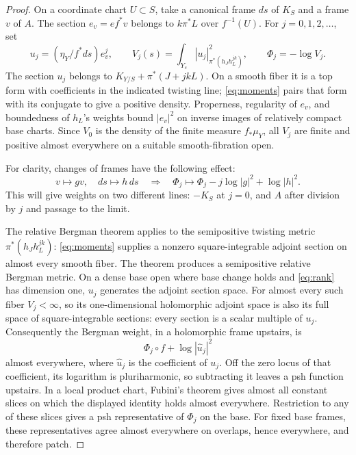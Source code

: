 \begin{proof}
On a coordinate chart \(U\subset S\), take a canonical frame \(ds\)
of \(K_S\) and a frame \(v\) of \(A\). The section
\(e_v=e f^*v\) belongs to \(k\pi^*L\) over \(f^{-1}(U)\). For
\(j=0,1,2,\ldots\), set
\begin{equation}\label{eq:moments}
 u_j=(\eta_Y/f^*ds)e_v^j,\qquad
 V_j(s)=\int_{Y_s}|u_j|_{\pi^*(h_Jh_L^{jk})}^2,
 \qquad \Phi_j=-\log V_j .
\end{equation}
The section \(u_j\) belongs to \(K_{Y/S}+\pi^*(J+jkL)\).
On a smooth fiber it is a top form with coefficients in the indicated
twisting line; \eqref{eq:moments} pairs that form with its conjugate
to give a positive density. Properness, regularity of \(e_v\), and
boundedness of \(h_L\)'s weights bound \(|e_v|^2\) on inverse images
of relatively compact base charts. Since \(V_0\) is the density of
the finite measure \(f_*\mu_Y\), all \(V_j\) are finite and positive
almost everywhere on a suitable smooth-fibration open.

For clarity, changes of frames have the following effect:
\begin{equation}\label{eq:frames}
 v\mapsto gv,\quad ds\mapsto h\,ds
 \quad\Longrightarrow\quad
 \Phi_j\mapsto \Phi_j-j\log|g|^2+\log|h|^2 .
\end{equation}
This will give weights on two different lines: \(-K_S\) at \(j=0\),
and \(A\) after division by \(j\) and passage to the limit.

The relative Bergman theorem
\cite[Theorem~0.1]{BerndtssonPaun2008}
applies to the semipositive twisting metric
\(\pi^*(h_Jh_L^{jk})\): \eqref{eq:moments} supplies a nonzero
square-integrable adjoint section on almost every smooth fiber.
The theorem produces a semipositive relative Bergman metric.
On a dense base open where base change holds and \eqref{eq:rank}
has dimension one, \(u_j\) generates the adjoint section space.
For almost every such fiber \(V_j<\infty\), so its one-dimensional
holomorphic adjoint space is also its full space of square-integrable
sections: every section is a scalar multiple of \(u_j\).
Consequently the Bergman weight, in a holomorphic frame upstairs, is
\[
 \Phi_j\circ f+\log|\widehat u_j|^2
\]
almost everywhere, where \(\widehat u_j\) is the coefficient of \(u_j\).
Off the zero locus of that coefficient, its logarithm is
pluriharmonic, so subtracting it leaves a psh function upstairs.
In a local product chart, Fubini's theorem gives almost all constant
slices on which the displayed identity holds almost everywhere.
Restriction to any of these slices gives a psh representative of
\(\Phi_j\) on the base. For fixed base frames, these representatives
agree almost everywhere on overlaps, hence everywhere, and therefore patch.


\end{proof}
